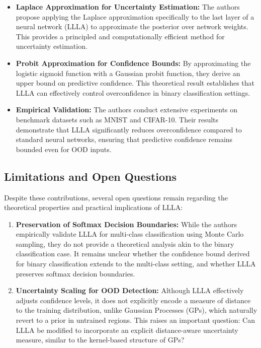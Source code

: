 \documentclass{article}
\begin{document}
\begin{itemize}
    \item \textbf{Laplace Approximation for Uncertainty Estimation:} 
    The authors propose applying the Laplace approximation specifically to the last layer of a neural network (LLLA) to approximate the posterior over network weights. This provides a principled and computationally efficient method for uncertainty estimation.
    
    \item \textbf{Probit Approximation for Confidence Bounds:} 
    By approximating the logistic sigmoid function with a Gaussian probit function, they derive an upper bound on predictive confidence. This theoretical result establishes that LLLA can effectively control overconfidence in binary classification settings.

    \item \textbf{Empirical Validation:} 
    The authors conduct extensive experiments on benchmark datasets such as MNIST and CIFAR-10. Their results demonstrate that LLLA significantly reduces overconfidence compared to standard neural networks, ensuring that predictive confidence remains bounded even for OOD inputs.
\end{itemize}

\subsection{Limitations and Open Questions}

Despite these contributions, several open questions remain regarding the theoretical properties and practical implications of LLLA:

\begin{enumerate}
    \item \textbf{Preservation of Softmax Decision Boundaries:} 
    While the authors empirically validate LLLA for multi-class classification using Monte Carlo sampling, they do not provide a theoretical analysis akin to the binary classification case. It remains unclear whether the confidence bound derived for binary classification extends to the multi-class setting, and whether LLLA preserves softmax decision boundaries.

    \item \textbf{Uncertainty Scaling for OOD Detection:} 
    Although LLLA effectively adjusts confidence levels, it does not explicitly encode a measure of distance to the training distribution, unlike Gaussian Processes (GPs), which naturally revert to a prior in untrained regions. This raises an important question: Can LLLA be modified to incorporate an explicit distance-aware uncertainty measure, similar to the kernel-based structure of GPs?
\end{enumerate}
\end{document}
